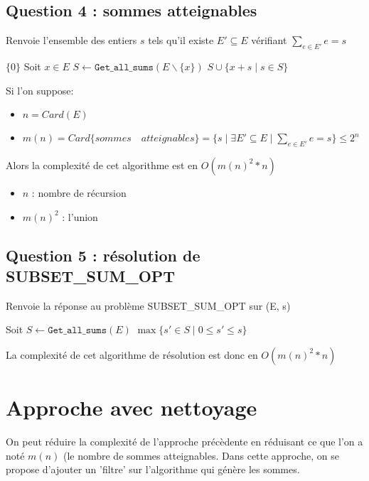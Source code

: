 \documentclass[10pt]{article}
\let\oldReturn\Return
\renewcommand{\Return}{\State\oldReturn}
\begin{document}
		\subsection{Question 4 : sommes atteignables}
			\begin{algorithm}
				\caption{Renvoie l'ensemble des entiers $s$ tels qu'il existe $E' \subseteq E$ vérifiant $\sum\limits_{e \in E'}e = s$}
				\begin{algorithmic}[1]
							\Return $\{0\}$
						\EndIf
						\State Soit $x \in E$
						\State $S \leftarrow \mathtt{Get\_all\_sums}(E \backslash \{x\})$
						\Return $S \cup \{x + s \mid s \in S\}$
					\EndFunction
				\end{algorithmic}
			\end{algorithm}
			Si l'on suppose:
			\begin{itemize}[label=-]
				\setlength\itemsep{0.1em}
				\item $n = Card(E)$
				\item $m(n) = Card\{sommes \quad atteignables\} = \{s \mid \exists E' \subseteq E \mid \sum\limits_{e \in E'}e = s\} \leq 2^n$
			\end{itemize}
			Alors la complexité de cet algorithme est en $\boxed{O(m(n)^2 * n)}$
			\begin{itemize}[label=-]
				\setlength\itemsep{0.1em}
				\item $n$ : nombre de récursion
				\item $m(n)^2$ : l'union
			\end{itemize}

		\subsection{Question 5 : résolution de SUBSET\_SUM\_OPT}
			\begin{algorithm}
				\caption{Renvoie la réponse au problème SUBSET\_SUM\_OPT sur (E, s)}
				\begin{algorithmic}[1]
					\Function{subset\_sum}{$E \subset \mathbb{N}, s \in \mathbb{N}$}
						\State Soit $S \leftarrow \mathtt{Get\_all\_sums}(E)$
						\Return $\max\{s' \in S \mid 0 \leq s' \leq s\}$
					\EndFunction
				\end{algorithmic}
			\end{algorithm}
			La complexité de cet algorithme de résolution est donc en $\boxed{O(m(n)^2 * n)}$

	\newpage
	\section{Approche avec nettoyage}\label{approche_naive}
		On peut réduire la complexité de l'approche précèdente en réduisant ce que l'on a noté $m(n)$ (le nombre de sommes atteignables.
		Dans cette approche, on se propose d'ajouter un 'filtre' sur l'algorithme qui génère les sommes.
\end{document}
